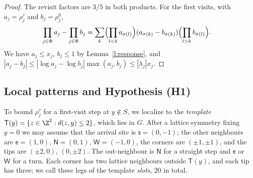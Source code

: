 \begin{proof}
The revisit factors are $3/5$ in both products. For the first visits, with $a_j = \rho^\tau_j$ and $b_j = \rho^0_j$,
\begin{equation*}
\prod_{j \in \Phi} a_j - \prod_{j \in \Phi} b_j = \sum_{k} \Bigl( \prod_{l < k} a_{\sigma(l)} \Bigr) (a_{\sigma(k)} - b_{\sigma(k)}) \Bigl( \prod_{l > k} b_{\sigma(l)} \Bigr).
\end{equation*}
We have $a_j \le x_j$, $b_j \le 1$ by Lemma~\ref{l:response}, and $|a_j - b_j| \le |\log a_j - \log b_j| \max(a_j, b_j) \le |\lambda_j| x_j$.
\end{proof}

\subsection{Local patterns and Hypothesis (H1)}\label{s:patterns}

To bound $\rho^\tau_j$ for a first-visit step at $y \notin S$, we localize to the \emph{template} $\mathsf T(y) = \{ z \in \Z^2 : d(z, y) \le 2 \}$, which lies in $G$. After a lattice symmetry fixing $y = 0$ we may assume that the arrival site is $\mathsf s = (0, -1)$; the other neighbours are $\mathsf e = (1, 0)$, $\mathsf N = (0, 1)$, $\mathsf W = (-1, 0)$, the corners are $(\pm 1, \pm 1)$, and the tips are $(\pm 2, 0)$, $(0, \pm 2)$. The out-neighbour is $\mathsf N$ for a straight step and $\mathsf e$ or $\mathsf W$ for a turn. Each corner has two lattice neighbours outside $\mathsf T(y)$, and each tip has three; we call these legs of the template \emph{slots}, $20$ in total.


